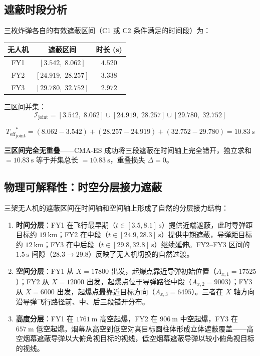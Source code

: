 \documentclass[12pt,a4paper]{ctexart}
\newcommand{\Teff}{T_{\text{eff}}}
\begin{document}
\subsection{遮蔽时段分析}

三枚炸弹各自的有效遮蔽区间（C1 或 C2 条件满足的时间段）为：

\begin{center}
\begin{tabular}{c|c|c}
\toprule
\textbf{无人机} & \textbf{遮蔽区间} & \textbf{时长 (s)} \\
\midrule
FY1 & $[3.542,\; 8.062]$ & $4.520$ \\
FY2 & $[24.919,\; 28.257]$ & $3.338$ \\
FY3 & $[29.780,\; 32.752]$ & $2.972$ \\
\bottomrule
\end{tabular}
\end{center}

三区间并集：
\begin{equation}
\boxed{\mathcal{I}_{\text{joint}} = [3.542,\; 8.062] \cup [24.919,\; 28.257] \cup [29.780,\; 32.752]}
\end{equation}

\begin{equation}
\boxed{{\Teff}_{\text{joint}}^* = (8.062 - 3.542) + (28.257 - 24.919) + (32.752 - 29.780) = 10.83\ \mathrm{s}}
\end{equation}

\textbf{三区间完全无重叠}——CMA-ES 成功将三段遮蔽在时间轴上完全错开，独立求和 $= 10.83\ \mathrm{s}$ 等于并集总长 $= 10.83\ \mathrm{s}$，重叠损失 $\Delta = 0$。

\subsection{物理可解释性：时空分层接力遮蔽}

三架无人机的遮蔽区间在时间轴和空间轴上形成了自然的分层接力结构：

\begin{enumerate}[label=(\arabic*), leftmargin=*]
    \item \textbf{时间分层}：FY1 在飞行最早期（$t \in [3.5, 8.1]\ \mathrm{s}$）提供近端遮蔽，此时导弹距目标约 $19\ \mathrm{km}$；FY2 在中段（$t \in [24.9, 28.3]\ \mathrm{s}$）提供中期遮蔽，导弹距目标约 $12\ \mathrm{km}$；FY3 在中后段（$t \in [29.8, 32.8]\ \mathrm{s}$）继续延伸。FY2--FY3 区间的 $1.5\ \mathrm{s}$ 间隙（$28.3 \to 29.8$）反映了无人机切换的自然过渡。
    \item \textbf{空间分层}：FY1 从 $X = 17800$ 出发，起爆点靠近导弹初始位置（$A_{x,1} = 17525$）；FY2 从 $X = 12000$ 出发，起爆点位于导弹路径中段（$A_{x,2} = 9003$）；FY3 从 $X = 6000$ 出发，起爆点最靠近目标方向（$A_{x,3} = 6495$）。三者在 $X$ 轴方向沿导弹飞行路径前、中、后三段错开分布。
    \item \textbf{高度分层}：FY1 在 $1761\ \mathrm{m}$ 高空起爆，FY2 在 $906\ \mathrm{m}$ 中空起爆，FY3 在 $657\ \mathrm{m}$ 低空起爆。烟幕从高空到低空对真目标圆柱体形成立体遮蔽覆盖——高空烟幕遮蔽导弹以大俯角视目标的视线，低空烟幕遮蔽导弹以较小俯角视目标的视线。
\end{enumerate}
\end{document}
